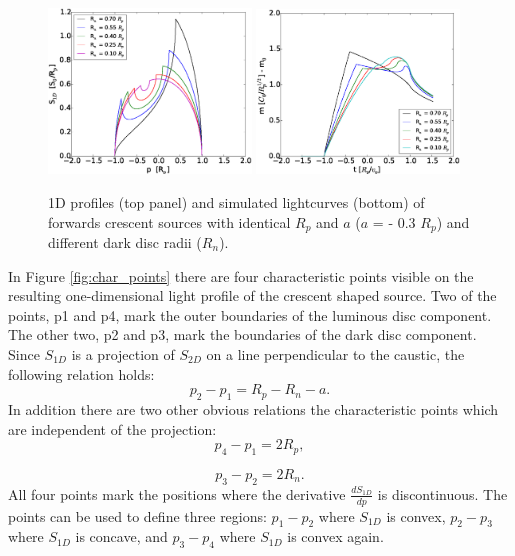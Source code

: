 \documentclass[usenatbib]{mn2e}
\begin{document}
\begin{figure}
\centering
    \includegraphics[width = 0.48\textwidth]{figures/S1D_var_rn_a_neg.eps}
    \includegraphics[width = 0.48\textwidth]{figures/5Rn_forw_var_magnification.eps}
\caption{\label{fig:lightcurve_crescent} 1D profiles (top panel) and simulated lightcurves (bottom) 
of forwards crescent sources with identical $R_p$ and $a$ ($a$ = - 0.3 $R_p$) and different dark disc radii ($R_n$). }
\end{figure}

In Figure \ref{fig:char_points} there are four characteristic points visible on the resulting one-dimensional 
light profile of the crescent shaped source. Two of the points, p1 and p4, mark the outer boundaries of the
 luminous disc component. The other two, p2 and p3, mark the boundaries of the dark disc component. 
Since $S_{1D}$ is a projection of $S_{2D}$ on a line perpendicular to the caustic, the following relation holds:
\begin{equation}
    p_2-p_1 = R_p -R_n - a.
\end{equation}
In addition there are two other obvious relations the characteristic points which are independent of the projection:
\begin{equation}
    p_4 -p_1 = 2 R_p,
\end{equation}

\begin{equation}
        p_3 -p_2 = 2 R_n.
\end{equation}
All four points mark the positions where the derivative $\frac{dS_{1D}}{dp}$ is discontinuous. The points can be used 
to define three regions: $p_1 - p_2$ where $S_{1D}$ is convex, $p_2 - p_3$ where $S_{1D}$ is concave, 
and $p_3 - p_4$ where $S_{1D}$ is convex again. \\
\end{document}

